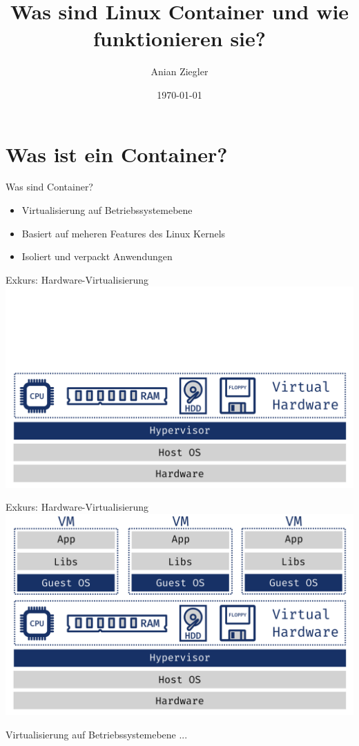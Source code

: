 \documentclass{beamer}
\title{Was sind Linux Container und wie funktionieren sie?}
\date{\today}
\author{Anian Ziegler}
\institute{cioplenu}
\begin{document}
  \maketitle
  \section{Was ist ein Container?}
  \begin{frame}{Was sind Container?}
    \begin{itemize}
      \item Virtualisierung auf Betriebssystemebene
      \item Basiert auf meheren Features des Linux Kernels
      \item Isoliert und verpackt Anwendungen
    \end{itemize}
  \end{frame}
  \begin{frame}{Exkurs: Hardware-Virtualisierung}
    \includegraphics[width=\textwidth]{hypervisor}
  \end{frame}
  \begin{frame}{Exkurs: Hardware-Virtualisierung}
    \includegraphics[width=\textwidth]{vms}
  \end{frame}
  \begin{frame}{Virtualisierung auf Betriebssystemebene}
    ...
  \end{frame}
\end{document}
